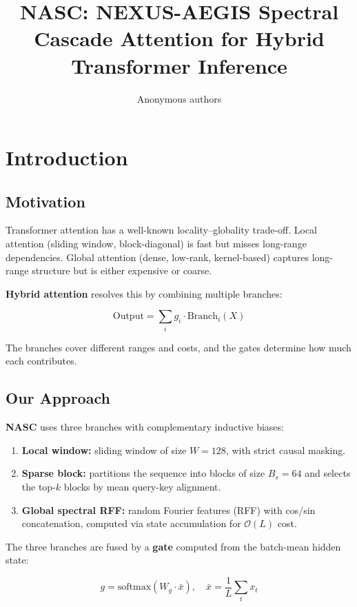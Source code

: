 \title{\textbf{NASC: NEXUS-AEGIS Spectral Cascade Attention for Hybrid Transformer Inference}}

\author{Anonymous authors}



\section{Introduction}

\subsection{Motivation}

Transformer attention has a well-known locality--globality trade-off. 
Local attention (sliding window, block-diagonal) is fast but misses 
long-range dependencies. Global attention (dense, low-rank, kernel-based) 
captures long-range structure but is either expensive or coarse.

\textbf{Hybrid attention} resolves this by combining multiple branches:

\[
\text{Output} = \sum_{i} g_i \cdot \text{Branch}_i(X)
\tag{1.1}
\]

The branches cover different ranges and costs, and the gates determine 
how much each contributes.

\subsection{Our Approach}

\textbf{NASC} uses three branches with complementary inductive biases:

\begin{enumerate}
\item \textbf{Local window:} sliding window of size $W = 128$, with
  strict causal masking.
\item \textbf{Sparse block:} partitions the sequence into blocks of size
  $B_s = 64$ and selects the top-$k$ blocks by mean
  query-key alignment.
\item \textbf{Global spectral RFF:} random Fourier features (RFF) with cos/sin
  concatenation, computed via state accumulation for $\mathcal{O}(L)$
  cost.

\end{enumerate}
The three branches are fused by a \textbf{gate} computed from the batch-mean 
hidden state:

\[
g = \text{softmax}(W_g \cdot \bar{x}), \quad \bar{x} = \frac{1}{L} \sum_t x_t
\tag{1.2}
\]

